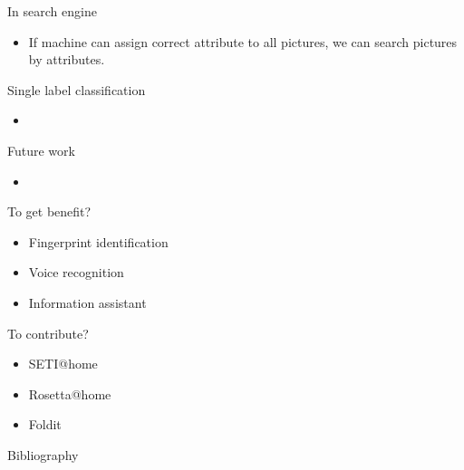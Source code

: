 \documentclass[first=dgreen,second=purple,logo=yellowexc]{aaltoslides}
\begin{document}
{\begin{frame}{In search engine}
	\begin{itemize}
		\item If machine can assign correct attribute to all pictures, we can search pictures by attributes.
	\end{itemize}
\end{frame}


\begin{frame}{Single label classification}
	\begin{itemize}
		\item 
	\end{itemize}
\end{frame}



\begin{frame}{Future work}
	\begin{itemize}
		\item 
	\end{itemize}
\end{frame}


\begin{frame}{To get benefit?}
	\begin{itemize}
		\item Fingerprint identification
		\item Voice recognition
		\item Information assistant
	\end{itemize}
\end{frame}


\begin{frame}{To contribute?}
	\begin{itemize}
		\item SETI@home
		\item Rosetta@home
		\item Foldit
	\end{itemize}
\end{frame}










\begin{frame}[allowframebreaks]{Bibliography}
%

 
\end{frame}

}
\end{document}
